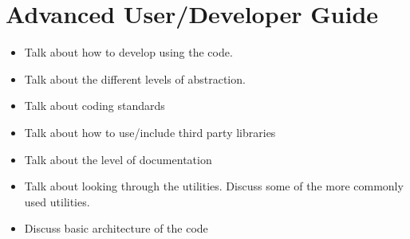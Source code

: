 \chapter{Advanced User/Developer Guide}
\label{advanced}
\begin{itemize}
\item Talk about how to develop using the code.
\item Talk about the different levels of abstraction.
\item Talk about coding standards
\item Talk about how to use/include third party libraries
\item Talk about the level of documentation
\item Talk about looking through the utilities.  Discuss some of the more commonly used utilities.
\item Discuss basic architecture of the code
\end{itemize}
